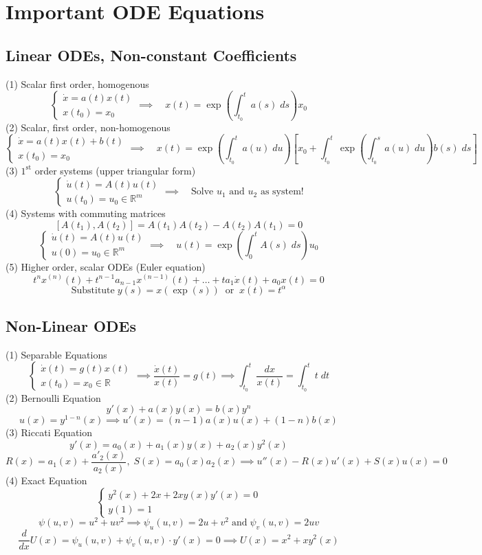 \section{Important ODE Equations}
\subsection{Linear ODEs, Non-constant Coefficients}
(1) Scalar first order, homogenous
$$
\begin{cases}
\dot{x} = a(t)x(t)\\
x(t_0) = x_0 
\end{cases} \implies \quad x(t) = \exp\left(\int_{t_0}^t a(s)\;ds\right)x_0
$$
(2) Scalar, first order, non-homogenous
$$
\begin{cases}
\dot{x} = a(t)x(t) + b(t) \\
x(t_0) = x_0
\end{cases} \implies \quad x(t) = \exp\left(\int_{t_0}^t a(u)\;du\right)\left[x_0 + \int_{t_0}^t\exp\left(\int_{t_0}^s a(u)\;du\right)b(s)\;ds \right]
$$
(3) $1^{\text{st}}$ order systems (upper triangular form)
$$
\begin{cases}
    \dot{u}(t) = A(t)u(t) \\
    u(t_0) = u_0 \in \mathbb{R}^m
\end{cases} \implies \quad \text{Solve $u_1$ and $u_2$ as system!}
$$
(4) Systems with commuting matrices
$$
[A(t_1),A(t_2)] = A(t_1)A(t_2) - A(t_2)A(t_1) = 0 
$$
$$
\begin{cases}
    \dot{u}(t) = A(t)u(t) \\
    u(0) = u_0 \in \mathbb{R}^m
\end{cases} \implies \quad u(t) = \exp\left(\int_0^t A(s)\;ds\right) u_0
$$
(5) Higher order, scalar ODEs (Euler equation)
$$
t^nx^{(n)}(t) + t^{n-1}a_{n-1}x^{(n-1)}(t) + \dots + ta_{1}\dot{x}(t) + a_0x(t) = 0
$$
$$
\text{Substitute}\;y(s) = x(\exp(s))\;\;\text{or}\;\;x(t) = t^\alpha
$$
\subsection{Non-Linear ODEs}
(1) Separable Equations 
$$
\begin{cases} \dot{x}(t) = g(t)x(t) \\
x(t_0) = x_0 \in \mathbb{R}
\end{cases} \implies \frac{\dot{x}(t)}{x(t)} = g(t) \implies \int_{t_0}^t \frac{dx}{x(t)} = \int_{t_0}^t t\;dt 
$$
(2) Bernoulli Equation 
$$
y'(x) + a(x)y(x) = b(x)y^n
$$
$$
u(x) = y^{1-n}(x) \implies u'(x) = (n-1)a(x)u(x) + (1-n)b(x)
$$
(3) Riccati Equation
$$
y'(x) = a_0(x) + a_1(x)y(x) + a_2(x)y^2(x)
$$
$$
R(x) = a_1(x) + \frac{a'_2(x)}{a_2(x)},\;S(x) = a_0(x)a_2(x) \implies u''(x) - R(x)u'(x) + S(x)u(x) = 0
$$
(4) Exact Equation
$$
\begin{cases}
    y^2(x) + 2x + 2xy(x)y'(x) = 0\\
    y(1) = 1
\end{cases}
$$
$$
\psi(u,v) = u^2 + uv^2 \implies \psi_u(u,v) = 2u+v^2\;\text{and}\;\psi_v(u,v) = 2uv
$$
$$
\frac{d}{dx}U(x) = \psi_u(u,v) + \psi_v(u,v) \cdot y'(x) = 0 \implies U(x) = x^2 + xy^2(x)
$$